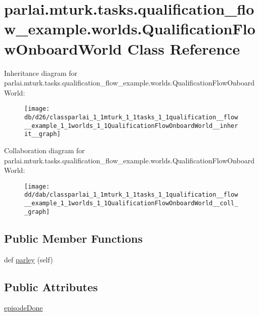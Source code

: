 \hypertarget{classparlai_1_1mturk_1_1tasks_1_1qualification__flow__example_1_1worlds_1_1QualificationFlowOnboardWorld}{}\section{parlai.\+mturk.\+tasks.\+qualification\+\_\+flow\+\_\+example.\+worlds.\+Qualification\+Flow\+Onboard\+World Class Reference}
\label{classparlai_1_1mturk_1_1tasks_1_1qualification__flow__example_1_1worlds_1_1QualificationFlowOnboardWorld}


Inheritance diagram for parlai.\+mturk.\+tasks.\+qualification\+\_\+flow\+\_\+example.\+worlds.\+Qualification\+Flow\+Onboard\+World\+:\nopagebreak
\begin{figure}[H]
\begin{center}
\leavevmode
\texttt{[image: db/d26/classparlai\_1\_1mturk\_1\_1tasks\_1\_1qualification\_\_flow\_\_example\_1\_1worlds\_1\_1QualificationFlowOnboardWorld\_\_inherit\_\_graph]}
\end{center}
\end{figure}


Collaboration diagram for parlai.\+mturk.\+tasks.\+qualification\+\_\+flow\+\_\+example.\+worlds.\+Qualification\+Flow\+Onboard\+World\+:\nopagebreak
\begin{figure}[H]
\begin{center}
\leavevmode
\texttt{[image: dd/dab/classparlai\_1\_1mturk\_1\_1tasks\_1\_1qualification\_\_flow\_\_example\_1\_1worlds\_1\_1QualificationFlowOnboardWorld\_\_coll\_\_graph]}
\end{center}
\end{figure}
\subsection*{Public Member Functions}
\begin{DoxyCompactItemize}
\item 
def \hyperlink{classparlai_1_1mturk_1_1tasks_1_1qualification__flow__example_1_1worlds_1_1QualificationFlowOnboardWorld_a45e6a5c9eff2ff559ff50736f521fc50}{parley} (self)
\end{DoxyCompactItemize}
\subsection*{Public Attributes}
\begin{DoxyCompactItemize}
\item 
\hyperlink{classparlai_1_1mturk_1_1tasks_1_1qualification__flow__example_1_1worlds_1_1QualificationFlowOnboardWorld_aec05fdc93336c41f6a7b190cd4426bc8}{episode\+Done}
\end{DoxyCompactItemize}


